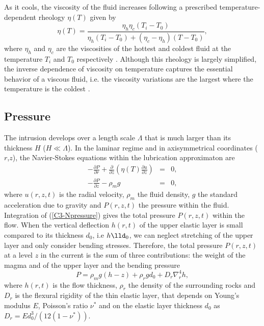 As  it  cools,  the  viscosity  of the  fluid  increases  following  a
prescribed temperature-dependent rheology $\eta(T)$ given by
\begin{equation}
  \eta(T)=\frac{\eta_h
    \eta_c(T_i-T_0)}{\eta_h(T_i-T_0)+(\eta_c-\eta_h)(T-T_0)},
  \label{C3-rheology}
\end{equation}
where $\eta_h$  and $\eta_c$  are the viscosities  of the  hottest and
coldest  fluid  at  the   temperature  $T_i$  and  $T_0$  respectively
\citep{Bercovici:2007vc}.    Although   this   rheology   is   largely
simplified,  the  inverse  dependence   of  viscosity  on  temperature
captures  the  essential  behavior  of  a  viscous  fluid,  i.e.   the
viscosity  variations are  the largest  where the  temperature is  the
coldest
\citep{Anonymous:CZVBrBvv,Marsh:1981dc,Lejeune:1995fc,Giordano:2008em}.

\subsection{Pressure}
\label{C3-sec:Pressure}

The  intrusion develops  over a  length scale  $\Lambda$ that  is much
larger than its thickness $H$ ($H \ll \Lambda$).  In the laminar regime
and  in   axisymmetrical  coordinates  ($r$,$z$),   the  Navier-Stokes
equations within the lubrication approximaton are
\begin{eqnarray}
  -\frac{\partial P}{\partial r}  +  \frac{\partial}{\partial z}\left(\eta(T) \frac{\partial u}{\partial z}\right) &=&0,\label{C3-V1} \\
  -\frac{\partial P}{\partial z}  - \rho_{m}g&  =&0,\label{C3-Npressure}
\end{eqnarray}
where $u(r,z,t)$ is  the radial velocity, $\rho_m$  the fluid density,
$g$  the  standard acceleration  due  to  gravity and  $P(r,z,t)$  the
pressure within the fluid.   Integration of (\ref{C3-Npressure}) gives
the  total pressure  $P(r,z,t)$ within  the flow.   When the  vertical
deflection $h(r,t)$  of the upper  elastic layer is small  compared to
its thickness  $d_0$, i.e $h\lld_0$,  we can neglect stretching  of the
upper layer and only consider  bending stresses.  Therefore, the total
pressure $P(r,z,t)$ at a level $z$ in  the current is the sum of three
contributions: the weight of the magma  and of the upper layer and the
bending pressure
\begin{equation}
  P = \rho_m g (h-z)+\rho_rgd_0+D_r\nabla_r^4h,
\end{equation}
where  $h(r,t)$ is  the flow  thickness, $\rho_r$  the density  of the
surrounding rocks and $D_r$ is the flexural rigidity of the thin elastic
layer, that  depends on Young's  modulus $E$, Poisson's  ratio $\nu^*$
and     on     the     elastic    layer     thickness     $d_0$     as
$D_r = Ed_0^3/\left(12(1-\nu^*)\right)$.

